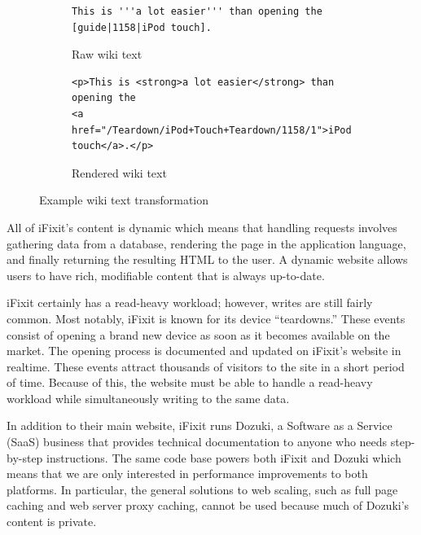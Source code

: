 \documentclass[12pt]{ucthesis}
\begin{document}
\begin{figure}[hbtp]
\begin{subfigure}[b]{1.0\textwidth}
\begin{ssp}
\begin{verbatim}
This is '''a lot easier''' than opening the [guide|1158|iPod touch].
\end{verbatim}
\caption{Raw wiki text}
\label{fig:wikiTextTransformationRaw}
\end{ssp}
\end{subfigure}

\vspace{2em}
\begin{subfigure}[b]{1.0\textwidth}
\begin{ssp}
\begin{verbatim}
<p>This is <strong>a lot easier</strong> than opening the
<a href="/Teardown/iPod+Touch+Teardown/1158/1">iPod touch</a>.</p>
\end{verbatim}
\caption{Rendered wiki text}
\label{fig:wikiTextTransformationRendered}
\end{ssp}
\end{subfigure}

\caption{Example wiki text transformation}
\label{fig:wikiTextTransformation}
\end{figure}

All of \textsf{iFixit}'s content is dynamic which means that handling requests involves gathering data from a database, rendering the page in the application language, and finally returning the resulting HTML to the user.
A dynamic website allows users to have rich, modifiable content that is always up-to-date.

\textsf{iFixit} certainly has a read-heavy workload; however, writes are still fairly common.
Most notably, \textsf{iFixit} is known for its device ``teardowns.''
These events consist of opening a brand new device as soon as it becomes available on the market.
The opening process is documented and updated on \textsf{iFixit}'s website in realtime.
These events attract thousands of visitors to the site in a short period of time.
Because of this, the website must be able to handle a read-heavy workload while simultaneously writing to the same data.

In addition to their main website, \textsf{iFixit} runs \textsf{Dozuki}, a Software as a Service (SaaS) business that provides technical documentation to anyone who needs step-by-step instructions.
The same code base powers both \textsf{iFixit} and \textsf{Dozuki} which means that we are only interested in performance improvements to both platforms.
In particular, the general solutions to web scaling, such as full page caching and web server proxy caching, cannot be used because much of \textsf{Dozuki}'s content is private.
\end{document}
